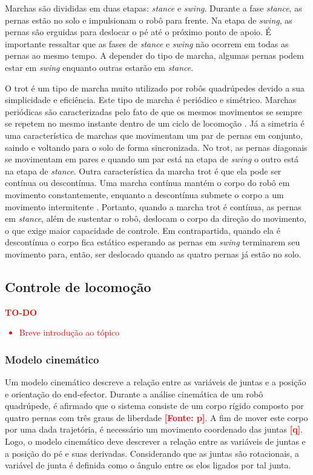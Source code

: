 \documentclass[../main.tex]{subfiles}
\begin{document}
  Marchas são divididas em duas etapas: \textit{stance} e \textit{swing}. Durante a fase \textit{stance}, as pernas estão no solo e impulsionam o robô para frente. Na etapa de \textit{swing}, as pernas são erguidas para deslocar o pé até o próximo ponto de apoio. É importante ressaltar que as fases de \textit{stance} e \textit{swing} não ocorrem em todas as pernas ao mesmo tempo. A depender do tipo de marcha, algumas pernas podem estar em \textit{swing} enquanto outras estarão em \textit{stance}.

  O trot é um tipo de marcha muito utilizado por robôs quadrúpedes devido a sua simplicidade e eficiência. Este tipo de marcha é periódico e simétrico. Marchas periódicas são caracterizadas pelo fato de que os mesmos movimentos se sempre se repetem no mesmo instante dentro de um ciclo de locomoção \cite{de2006quadrupedal}. Já a simetria é uma característica de marchas que movimentam um par de pernas em conjunto, saindo e voltando para o solo de forma sincronizada. No trot, as pernas diagonais se movimentam em pares e quando um par está na etapa de \textit{swing} o outro está na etapa de \textit{stance}. Outra característica da marcha trot é que ela pode ser contínua ou descontínua. Uma marcha contínua mantém o corpo do robô em movimento constantemente, enquanto a descontínua submete o corpo a um movimento intermitente \cite{de2006quadrupedal}. Portanto, quando a marcha trot é contínua, as pernas em \textit{stance}, além de sustentar o robô, deslocam o corpo da direção do movimento, o que exige maior capacidade de controle. Em contrapartida, quando ela é descontínua o corpo fica estático esperando as pernas em \textit{swing} terminarem seu movimento para, então, ser deslocado quando as quatro pernas já estão no solo.

  \subsection{Controle de locomoção}
  \textcolor{red}{\textbf{TO-DO}
  \begin{itemize}
    \item Breve introdução ao tópico
  \end{itemize}
  }

  \subsubsection{Modelo cinemático}
  Um modelo cinemático descreve a relação entre as variáveis de juntas e a posição e orientação do end-efector. Durante a análise cinemática de um robô quadrúpede, é afirmado que o sistema consiste de um corpo rígido composto por quatro pernas com três graus de liberdade \textbf{\textcolor{red}{[Fonte: p]}}. A fim de mover este corpo por uma dada trajetória, é necessário um movimento coordenado das juntas \textbf{\textcolor{red}{[q]}}. Logo, o modelo cinemático deve descrever a relação entre as variáveis de juntas e a posição do pé e suas derivadas. Considerando que as juntas são rotacionais, a variável de junta é definida como o ângulo entre os elos ligados por tal junta.
\end{document}
